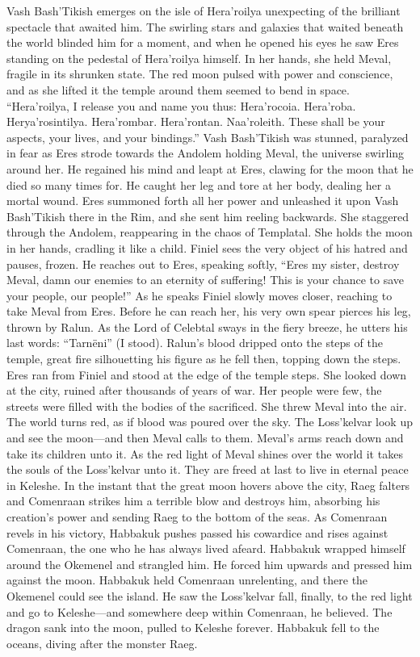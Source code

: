 \documentclass[smalldemyvopaper,11pt,twoside,onecolumn,openright,extrafontsizes]{memoir}
\begin{document}
	Vash Bash’Tikish emerges on the isle of Hera’roilya unexpecting of the brilliant spectacle that awaited him. The swirling stars and galaxies that waited beneath the world blinded him for a moment, and when he opened his eyes he saw Eres standing on the pedestal of Hera’roilya himself. In her hands, she held Meval, fragile in its shrunken state. The red moon pulsed with power and conscience, and as she lifted it the temple around them seemed to bend in space. “Hera’roilya, I release you and name you thus: Hera’rocoia. Hera’roba. Herya’rosintilya. Hera’rombar. Hera’rontan. Naa’roleith. These shall be your aspects, your lives, and your bindings.” Vash Bash’Tikish was stunned, paralyzed in fear as Eres strode towards the Andolem holding Meval, the universe swirling around her. He regained his mind and leapt at Eres, clawing for the moon that he died so many times for. He caught her leg and tore at her body, dealing her a mortal wound. Eres summoned forth all her power and unleashed it upon Vash Bash’Tikish there in the Rim, and she sent him reeling backwards. She staggered through the Andolem, reappearing in the chaos of Templatal. She holds the moon in her hands, cradling it like a child. Finiel sees the very object of his hatred and pauses, frozen. He reaches out to Eres, speaking softly, “Eres my sister, destroy Meval, damn our enemies to an eternity of suffering! This is your chance to save your people, our people!” As he speaks Finiel slowly moves closer, reaching to take Meval from Eres. Before he can reach her, his very own spear pierces his leg, thrown by Ralun. As the Lord of Celebtal sways in the fiery breeze, he utters his last words: “Tarnëni” (I stood). Ralun’s blood dripped onto the steps of the temple, great fire silhouetting his figure as he fell then, topping down the steps. Eres ran from Finiel and stood at the edge of the temple steps. She looked down at the city, ruined after thousands of years of war. Her people were few, the streets were filled with the bodies of the sacrificed. She threw Meval into the air. 
The world turns red, as if blood was poured over the sky. The Loss’kelvar look up and see the moon—and then Meval calls to them. Meval’s arms reach down and take its children unto it. As the red light of Meval shines over the world it takes the souls of the Loss’kelvar unto it. They are freed at last to live in eternal peace in Keleshe. In the instant that the great moon hovers above the city, Raeg falters and Comenraan strikes him a terrible blow and destroys him, absorbing his creation’s power and sending Raeg to the bottom of the seas. As Comenraan revels in his victory, Habbakuk pushes passed his cowardice and rises against Comenraan, the one who he has always lived afeard. Habbakuk wrapped himself around the Okemenel and strangled him. He forced him upwards and pressed him against the moon. Habbakuk held Comenraan unrelenting, and there the Okemenel could see the island. He saw the Loss’kelvar fall, finally, to the red light and go to Keleshe—and somewhere deep within Comenraan, he believed. The dragon sank into the moon, pulled to Keleshe forever. Habbakuk fell to the oceans, diving after the monster Raeg.
\end{document}
